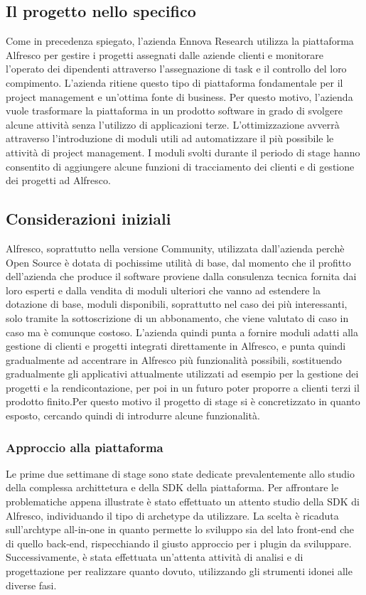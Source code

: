 \subsection{Il progetto nello specifico}
Come in precedenza spiegato, l’azienda Ennova Research utilizza la piattaforma Alfresco
per gestire i progetti assegnati dalle aziende clienti e monitorare l’operato dei dipendenti
attraverso l’assegnazione di task e il controllo del loro compimento.
L’azienda ritiene questo tipo di piattaforma fondamentale per il project management
e un’ottima fonte di business. Per questo motivo, l’azienda vuole trasformare la
piattaforma in un prodotto software in grado di svolgere alcune attività senza l’utilizzo
di applicazioni terze. L’ottimizzazione avverrà attraverso l’introduzione di moduli utili
ad automatizzare il più possibile le attività di project management. I moduli svolti
durante il periodo di stage hanno consentito di aggiungere alcune funzioni di tracciamento dei clienti e di gestione dei progetti ad Alfresco.
\subsection{Considerazioni iniziali}
Alfresco, soprattutto nella versione Community, utilizzata dall'azienda perchè Open Source è dotata di pochissime utilità di base, dal momento che il profitto dell'azienda che produce il software proviene dalla consulenza tecnica fornita dai loro esperti e dalla vendita di moduli ulteriori che vanno ad estendere la dotazione di base, moduli disponibili, soprattutto nel caso dei più interessanti, solo tramite la sottoscrizione di un abbonamento, che viene valutato di caso in caso ma è comunque costoso. L'azienda quindi punta a fornire moduli adatti alla gestione di clienti e progetti integrati direttamente in Alfresco, e punta quindi gradualmente ad accentrare in Alfresco più funzionalità possibili, sostituendo gradualmente gli applicativi attualmente utilizzati ad esempio per la gestione dei progetti e la rendicontazione, per poi in un futuro poter proporre a  clienti terzi il prodotto finito.Per questo motivo il progetto di stage si è concretizzato in quanto esposto, cercando quindi di introdurre alcune funzionalità.
\subsubsection{Approccio alla piattaforma}
Le prime due settimane di stage sono state dedicate prevalentemente allo studio della complessa archittetura
e della SDK della piattaforma.
Per affrontare le problematiche appena illustrate è stato effettuato un attento studio
della SDK di Alfresco, individuando il tipo di archetype da utilizzare. La scelta è
ricaduta sull’archtype all-in-one in quanto permette lo sviluppo sia del lato front-end
che di quello back-end, rispecchiando il giusto approccio per i plugin da sviluppare.
Successivamente, è stata effettuata un’attenta attività di analisi e di progettazione per
realizzare quanto dovuto, utilizzando gli strumenti idonei alle diverse fasi.
